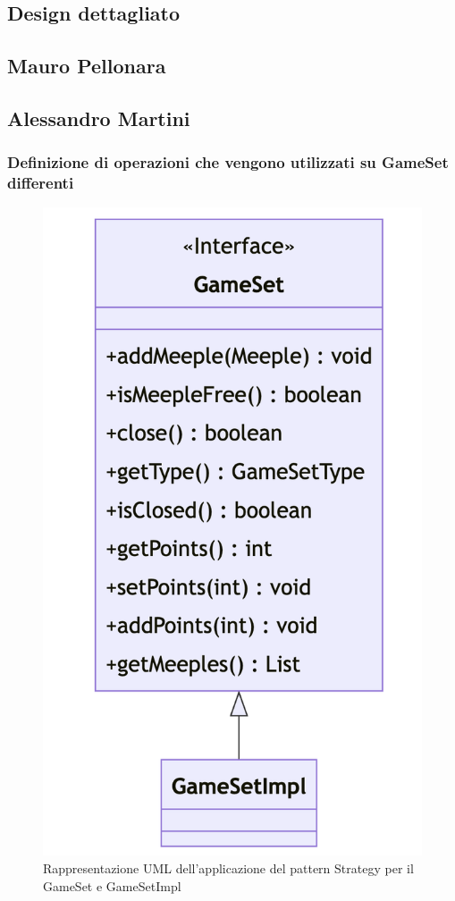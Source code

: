 \subsection{Design dettagliato}

\subsection*{Mauro Pellonara}

\subsection*{Alessandro Martini}
\subsubsection*{Definizione di operazioni che vengono utilizzati su GameSet differenti}
\begin{figure}[ht]
    \centering\includegraphics[scale=.4]{images/gameset.png}
    \caption{Rappresentazione UML dell'applicazione del pattern Strategy per il GameSet e GameSetImpl}
\end{figure}

